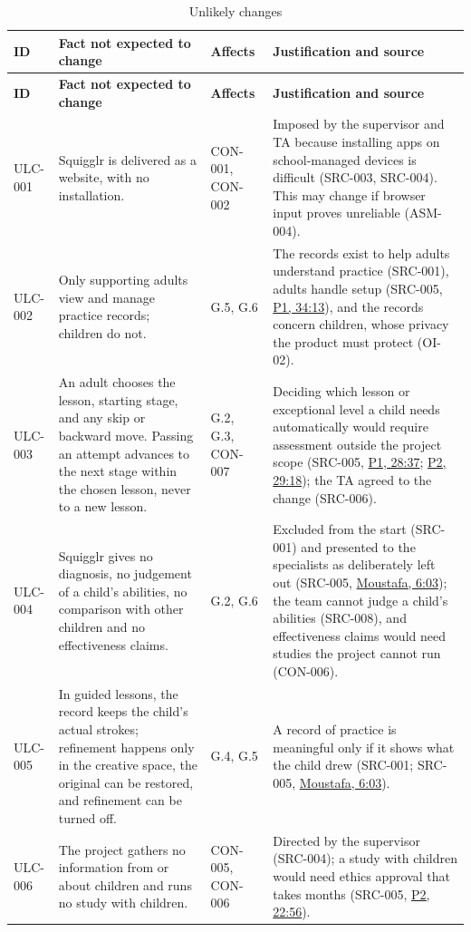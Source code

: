 \documentclass[12pt]{article}
\renewcommand{\_}{\textunderscore\allowbreak}%
\newcommand{\intlink}[3]{\hyperref[int:#1-#2]{#3}}
\newcommand{\intref}[2]{\intlink{#1}{#2}{#1, #2}}
\begin{document}
{\small
\begin{longtable}{@{}>{\raggedright\arraybackslash}p{}%
>{\raggedright\arraybackslash}p{}%
>{\raggedright\arraybackslash}p{}%
>{\raggedright\arraybackslash}p{}@{}} \caption{Unlikely
changes}\label{tab:unlikelyChanges}\\
\toprule
\textbf{ID} & \textbf{Fact not expected to change} & \textbf{Affects} &
\textbf{Justification and source} \\
\midrule
\endfirsthead
\toprule
\textbf{ID} & \textbf{Fact not expected to change} & \textbf{Affects} &
\textbf{Justification and source} \\
\midrule
\endhead
\bottomrule
\endlastfoot
ULC-001 & Squigglr is delivered as a website, with no installation. & CON-001,
CON-002 & Imposed by the supervisor and TA because installing apps on
school-managed devices is difficult (SRC-003, SRC-004). This may change if
browser input proves unreliable (ASM-004). \\
\addlinespace
ULC-002 & Only supporting adults view and manage practice records; children do
not. & G.5, G.6 & The records exist to help adults understand practice
(SRC-001), adults handle setup (SRC-005, \intref{P1}{34:13}), and the records
concern children, whose privacy the product must protect (OI-02). \\
\addlinespace
ULC-003 & An adult chooses the lesson, starting stage, and any skip or backward
move. Passing an attempt advances to the next stage within the chosen lesson,
never to a new lesson. & G.2, G.3, CON-007 & Deciding which lesson or
exceptional level a child needs automatically would require assessment outside
the project scope (SRC-005, \intref{P1}{28:37}; \intref{P2}{29:18}); the TA
agreed to the change (SRC-006). \\
\addlinespace
ULC-004 & Squigglr gives no diagnosis, no judgement of a child's abilities, no
comparison with other children and no effectiveness claims. & G.2, G.6 &
Excluded from the start (SRC-001) and presented to the specialists as
deliberately left out (SRC-005, \intref{Moustafa}{6:03}); the team cannot judge
a child's abilities (SRC-008), and effectiveness claims would need studies the
project cannot run (CON-006). \\
\addlinespace
ULC-005 & In guided lessons, the record keeps the child's actual strokes;
refinement happens only in the creative space, the original can be restored, and
refinement can be turned off. & G.4, G.5 & A record of practice is meaningful
only if it shows what the child drew (SRC-001; SRC-005,
\intref{Moustafa}{6:03}). \\
\addlinespace
ULC-006 & The project gathers no information from or about children and runs no
study with children. & CON-005, CON-006 & Directed by the supervisor (SRC-004);
a study with children would need ethics approval that takes months (SRC-005,
\intref{P2}{22:56}). \\
\end{longtable}
}
\end{document}
